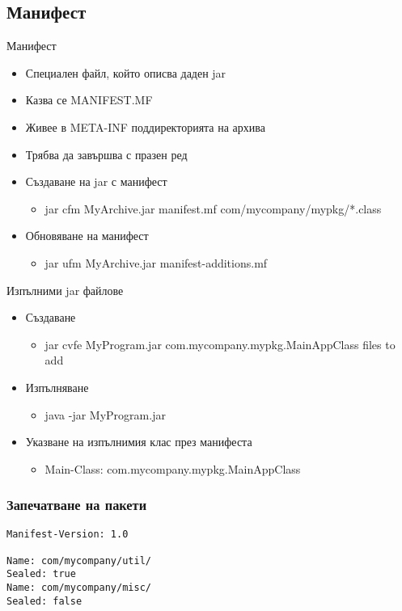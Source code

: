 \documentclass{beamer}
\begin{document}
\subsection{Манифест}

\begin{frame}{Манифест}
  \transdissolve
  \begin{itemize}
  \item Специален файл, който описва даден jar
  \item Казва се MANIFEST.MF
  \item Живее в META-INF поддиректорията на архива
  \item Трябва да завършва с празен ред
  \item Създаване на jar с манифест
    \begin{itemize}
    \item jar cfm MyArchive.jar manifest.mf com/mycompany/mypkg/*.class
    \end{itemize}
  \item Обновяване на манифест
    \begin{itemize}
    \item jar ufm MyArchive.jar manifest-additions.mf
    \end{itemize}
  \end{itemize}
\end{frame}

\begin{frame}{Изпълними jar файлове}
  \transdissolve
  \begin{itemize}
  \item Създаване
    \begin{itemize}
    \item jar cvfe MyProgram.jar com.mycompany.mypkg.MainAppClass files to add
    \end{itemize}
  \item Изпълняване
    \begin{itemize}
    \item java -jar MyProgram.jar
    \end{itemize}
  \item Указване на изпълнимия клас през манифеста
    \begin{itemize}
    \item Main-Class: com.mycompany.mypkg.MainAppClass
    \end{itemize}
  \end{itemize}
\end{frame}

\begin{frame}[fragile]
  \frametitle{Запечатване на пакети}
  \transdissolve
\begin{lstlisting}
Manifest-Version: 1.0

Name: com/mycompany/util/
Sealed: true
Name: com/mycompany/misc/
Sealed: false
\end{lstlisting}
\end{frame}
\end{document}
